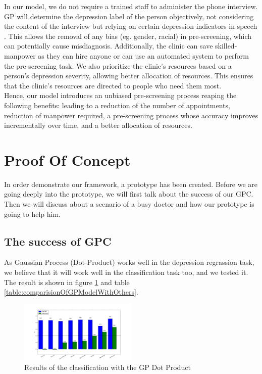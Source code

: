 \documentclass{article}
\begin{document}
	In our model, we do not require a trained staff to administer the phone interview. 
	GP will determine the depression label of the person objectively, not considering the content of the interview but relying on certain depression indicators in speech \cite{nimh2015}. 
	This allows the removal of any bias (eg. gender, racial) in pre-screening, which can potentially cause misdiagnosis. 
	Additionally, the clinic can save skilled-manpower as they can hire anyone or can use an automated system to perform the pre-screening task.
	We also prioritize the clinic's resources based on a person's depression severity, allowing better allocation of resources. 
	This ensures that the clinic's resources are directed to people who need them most. \\

	Hence, our model introduces an unbiased pre-screening process reaping the following benefits: leading to a reduction of the number of appointments, reduction of manpower required, a pre-screening process whose accuracy improves incrementally over time, and a better allocation of resources.

	\section{Proof Of Concept}
	In order demonstrate our framework, a prototype has been created. Before we are going deeply into the prototype, 
	we will first talk about the success of our GPC. Then we will discuss about a scenario of a busy doctor and how our prototype is going to help him.
	
	\subsection{The success of GPC}
		As Gaussian Process (Dot-Product) works well in the depression regrassion task, we believe that it will work well in the classification task too, 
		and we tested it. The result is shown in figure \ref{figure:gp_dot_product} and table \ref{table:comparisionOfGPModelWithOthers}. \\
	
         \begin{figure}[h]
 		    \begin{center}
		    \includegraphics[width=0.5\textwidth]{gp_dot_product}
  		    \end{center}
  		    \caption{Results of the classification with the GP Dot Product}
  		    \label{figure:gp_dot_product}
 	    \end{figure}
\end{document}
